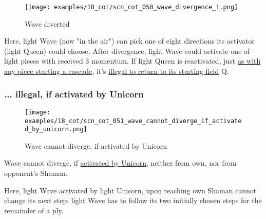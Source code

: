 \clearpage %

\vspace*{-2.1\baselineskip}
\noindent
\begin{figure}[!h]
\texttt{[image: examples/18\_cot/scn\_cot\_050\_wave\_divergence\_1.png]}
\vspace*{-1.3\baselineskip}
\caption{Wave diverted}
\label{fig:scn_cot_050_wave_divergence_1}
\end{figure}

\vspace*{-0.4\baselineskip}
Here, light Wave (now "in the air") can pick one of eight directions its activator
(light Queen) could choose. After divergence, light Wave could activate one of light
pieces with received 3 momentum. If light Queen is reactivated, just
\hyperref[fig:scn_mv_46_static_move_is_illegal_init]{as with any piece starting a cascade}, it's
\hyperref[fig:scn_cot_031_own_shaman_is_divergent_end]{illegal to return to its starting field} Q.

\clearpage %

\subsubsection*{... illegal, if activated by Unicorn}
\label{sec:Conquest of Tlalocan/Divergence/... illegal, if activated by Unicorn}

\vspace*{-1.4\baselineskip}
\noindent
\begin{figure}[!h]
\texttt{[image: examples/18\_cot/scn\_cot\_051\_wave\_cannot\_diverge\_if\_activated\_by\_unicorn.png]}
\vspace*{-1.3\baselineskip}
\caption{Wave cannot diverge, if activated by Unicorn}
\label{fig:scn_cot_051_wave_cannot_diverge_if_activated_by_unicorn}
\end{figure}

\vspace*{-0.5\baselineskip}
Wave cannot diverge, if
\hyperref[fig:scn_mv_24_wave_activation_by_unicorn_first_step]{activated by Unicorn},
neither from own, nor from opponent's Shaman.

Here, light Wave activated by light Unicorn, upon reaching own Shaman cannot change
its next step; light Wave has to follow its two initially chosen steps for the
remainder of a ply.

